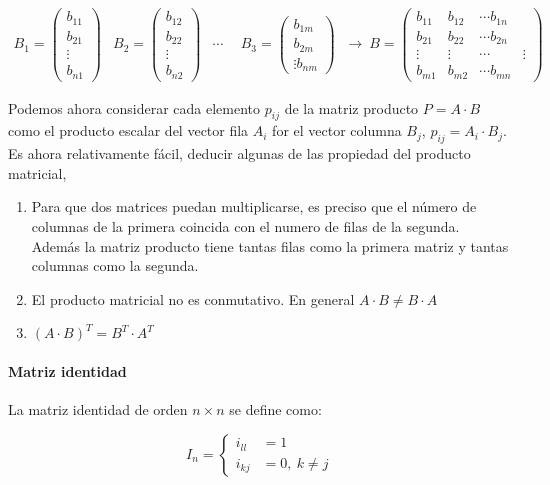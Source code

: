 \begin{equation*}
\begin{aligned}
B_1=\begin{pmatrix}
b_{11}\\ b_{21}\\ \vdots \\ b_{n1}
\end{pmatrix}&
B_2=\begin{pmatrix}
b_{12}\\ b_{22}\\ \vdots\\ b_{n2}
\end{pmatrix} &
\cdots  \  \  &
B_3=\begin{pmatrix}
b_{1m}\\ b_{2m}\\ \vdots  b_{nm}
\end{pmatrix}
\end{aligned} \ \rightarrow \ 
B=\begin{pmatrix}
b_{11}& b_{12}& \cdots b_{1n}\\
b_{21}& b_{22}& \cdots b_{2n}\\
\vdots& \vdots& \cdots& \vdots \\
b_{m1}& b_{m2}& \cdots b_{mn}
\end{pmatrix}
\end{equation*}

\begin{paracol}{2}
Podemos ahora considerar  cada elemento $p_{ij}$ de la matriz producto $P=A\cdot B$ como el producto escalar del vector fila $A_i$ for el vector columna $B_j$, $p_{ij}=A_i\cdot B_j$. 
Es ahora relativamente fácil, deducir algunas de las propiedad del producto matricial,

\begin{enumerate}
\item Para que dos matrices puedan multiplicarse, es preciso que el número de columnas de la primera coincida con el numero de filas de la segunda. Además la matriz producto tiene tantas filas como la primera matriz y tantas columnas como la segunda.

\item El producto matricial no es conmutativo. En general $A\cdot B \neq B \cdot A$

\item $(A\cdot B)^T=B^T\cdot A^T$
\end{enumerate}
\paragraph{Matriz identidad} La matriz identidad de orden $n\times n$ se 
define como:
\end{paracol}
\begin{equation*}
I_n= \left\{ 
\begin{aligned}
i_{ll}&=1\\
i_{kj}&=0, \ k\neq j
\end{aligned}
\right.
\end{equation*}

